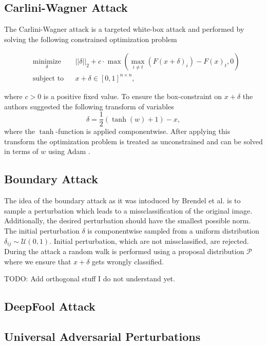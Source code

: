 \documentclass{article}
\begin{document}
\subsection{Carlini-Wagner Attack}

The Carlini-Wagner attack \cite{carlini} is a targeted white-box attack and performed by solving the following constrained optimization problem

\begin{equation*}
	\begin{aligned}
	& \underset{\delta}{\text{minimize}}
	& & ||\delta||_2 + c \cdot \max(\max_{i\neq t}(F(x+\delta)_i)-F(x)_t, 0) \\
	& \text{subject to}
	& & x+\delta \in [0,1]^{n \times n},
	\end{aligned}
\end{equation*}

where $c>0$ is a positive fixed value. To ensure the box-constraint on $x+\delta$ the authors suggested the following transform of variables 
$$\delta = \frac{1}{2}(\tanh(w)+1)-x,$$ where the $\tanh$-function is applied componentwise. After applying this transform the optimization problem is treated as unconstrained and can be solved in terms of $w$ using Adam \cite{adam}. 

\subsection{Boundary Attack}

The idea of the boundary attack as it was intoduced by Brendel et al. \cite{boundary} is to sample a perturbation which leads to a missclassification of the original image. Additionally, the desired perturbation should have the smallest possible norm. The initial perturbation $\delta$ is componentwise sampled from a uniform distribution $\delta_{ij}\sim \mathcal{U}(0,1)$. Initial perturbation, which are not missclassified, are rejected. During the attack a random walk is performed using a proposal distribution $\mathcal{P}$ where we ensure that $x+\delta$ gets wrongly classified.

TODO: Add orthogonal stuff I do not understand yet.

\subsection{DeepFool Attack}

\cite{deepfool}

\subsection{Universal Adversarial Perturbations}
\cite{universal}
\end{document}
